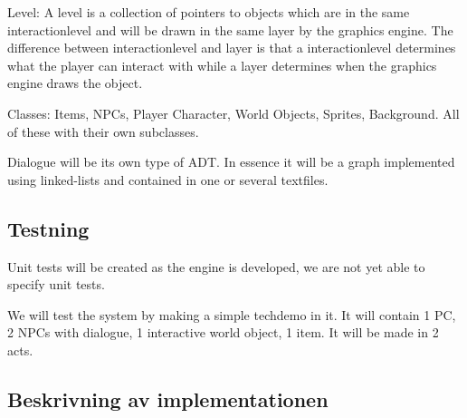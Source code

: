 \documentclass[12pt,a4paper]{article}
\begin{document}
Level: A level is a collection of pointers to objects which are in the same interactionlevel and will be drawn in the same layer by the graphics engine. The difference between interactionlevel and layer is that a interactionlevel determines what the player can interact with while a layer determines when the graphics engine draws the object.


Classes: Items, NPCs, Player Character, World Objects, Sprites, Background. All of these with their own subclasses.

Dialogue will be its own type of ADT. In essence it will be a graph implemented using linked-lists and contained in one or several textfiles. 


\subsection{Testning}

Unit tests will be created as the engine is developed, we are not yet able to specify unit tests.

We will test the system by making a simple techdemo in it. It will contain 1 PC, 2 NPCs with dialogue, 1 interactive world object, 1 item. It will be made in 2 acts.

\subsection{Beskrivning av implementationen}
\end{document}
